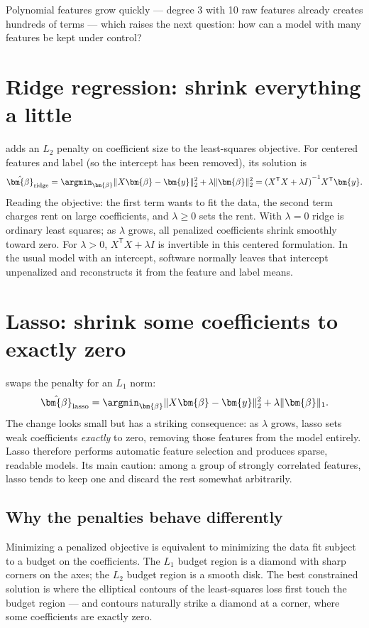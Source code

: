 Polynomial features grow quickly --- degree 3 with 10 raw features already creates hundreds of terms --- which raises the next question: how can a model with many features be kept under control?

\section{Ridge regression: shrink everything a little}

 adds an $L_2$ penalty on coefficient size to the least-squares objective. For centered features and label (so the intercept has been removed), its solution is
\[
  \hat{\bm{\beta}}_{\mathrm{ridge}}
  =\argmin_{\bm{\beta}}
  \|X\bm{\beta}-\bm{y}\|_2^2
  +\lambda\|\bm{\beta}\|_2^2
  ={(X^{\mathsf T}X+\lambda I)}^{-1}X^{\mathsf T}\bm{y}.
\]
Reading the objective: the first term wants to fit the data, the second term charges rent on large coefficients, and $\lambda\geq 0$ sets the rent. With $\lambda=0$ ridge is ordinary least squares; as $\lambda$ grows, all penalized coefficients shrink smoothly toward zero. For $\lambda>0$, $X^{\mathsf T}X+\lambda I$ is invertible in this centered formulation. In the usual model with an intercept, software normally leaves that intercept unpenalized and reconstructs it from the feature and label means.

\section{Lasso: shrink some coefficients to exactly zero}

 swaps the penalty for an $L_1$ norm:
\[
  \hat{\bm{\beta}}_{\mathrm{lasso}}
  =\argmin_{\bm{\beta}}
  \|X\bm{\beta}-\bm{y}\|_2^2
  +\lambda\|\bm{\beta}\|_1.
\]
The change looks small but has a striking consequence: as $\lambda$ grows, lasso sets weak coefficients \emph{exactly} to zero, removing those features from the model entirely. Lasso therefore performs automatic feature selection and produces sparse, readable models. Its main caution: among a group of strongly correlated features, lasso tends to keep one and discard the rest somewhat arbitrarily.

\subsection{Why the penalties behave differently}

Minimizing a penalized objective is equivalent to minimizing the data fit subject to a budget on the coefficients. The $L_1$ budget region is a diamond with sharp corners on the axes; the $L_2$ budget region is a smooth disk. The best constrained solution is where the elliptical contours of the least-squares loss first touch the budget region --- and contours naturally strike a diamond at a corner, where some coefficients are exactly zero.

